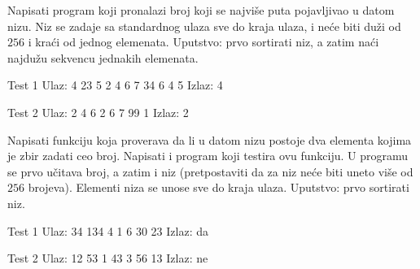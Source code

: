\begin{Answer}[ref=502]
\end{Answer}
\begin{Exercise}[label=503]
  Napisati program koji pronalazi broj koji se najviše puta
  pojavljivao u datom nizu. Niz se zadaje sa standardnog ulaza sve do
  kraja ulaza, i neće biti duži od $256$ i kraći od jednog
  elemenata. Uputstvo: prvo sortirati niz, a zatim naći najdužu
  sekvencu jednakih elemenata.
  
\begin{miditest}
\begin{test}{Test 1}
Ulaz:   4 23 5 2 4 6 7 34 6 4 5
Izlaz:  4
\end{test}
\end{miditest}
\begin{miditest}
\begin{test}{Test 2}
Ulaz:   2 4 6 2 6 7 99 1
Izlaz:  2
\end{test}
\end{miditest}
  
\end{Exercise}

\begin{Answer}[ref=503]
\end{Answer}
\begin{Exercise}[label=504]
  Napisati funkciju koja proverava da li u datom nizu postoje dva
  elementa kojima je zbir zadati ceo broj. Napisati i program koji
  testira ovu funkciju. U programu se prvo učitava broj, a zatim i niz
  (pretpostaviti da za niz neće biti uneto više od $256$ brojeva).
  Elementi niza se unose sve do kraja ulaza. Uputstvo: prvo sortirati
  niz.
  
\begin{miditest}
\begin{test}{Test 1}
Ulaz:   34 134 4 1 6 30 23
Izlaz:  da
\end{test}
\end{miditest}
\begin{miditest}
\begin{test}{Test 2}
Ulaz:   12 53 1 43 3 56 13
Izlaz:  ne
\end{test}
\end{miditest}
  
\end{Exercise}


